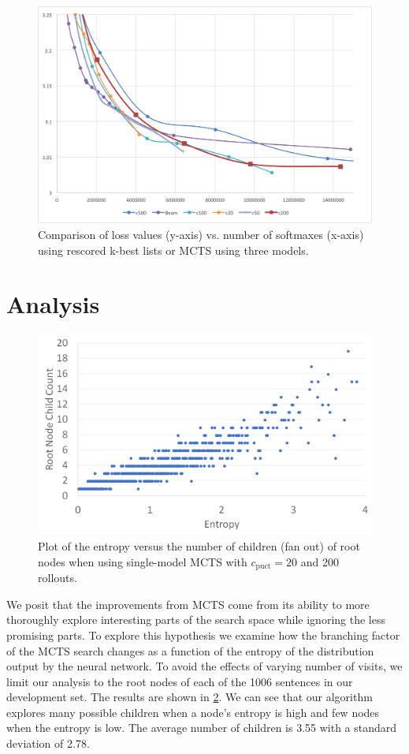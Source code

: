 \documentclass[11pt,a4paper]{article}
\begin{document}
\begin{figure}
\centering
\includegraphics[scale=0.35]{mcts_3models.png}
\caption{Comparison of loss values (y-axis) vs. number of softmaxes (x-axis) using rescored k-best lists
or MCTS using three models.}
\label{fig:3models}
\end{figure}

\section{Analysis}
\label{sec:analysis}

\begin{figure}
\centering
\includegraphics[scale=0.2]{branch_entropy.png}
\caption{Plot of the entropy versus the number of children (fan out) of root
nodes when using single-model MCTS with $c_{\text{puct}}=20$ and 200 rollouts.}
\label{fig:entropy}
\end{figure}

We posit that the improvements from MCTS come from its ability to more
thoroughly explore interesting parts of the search space while ignoring the
less promising parts. To explore this hypothesis we examine how the branching
factor of the MCTS search changes as a function of the entropy of the
distribution output by the neural network. To avoid the effects of varying
number of visits, we limit our analysis to the root nodes of each of the 1006
sentences in our development set. The results are shown in \ref{fig:entropy}.
We can see that our algorithm explores many possible children when a node's
entropy is high and few nodes when the entropy is low. The average number of
children is 3.55 with a standard deviation of 2.78.
\end{document}
